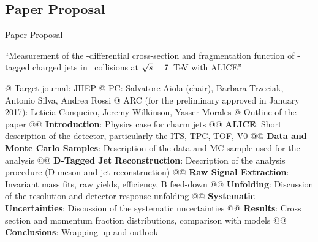 \documentclass[xcolor={usenames,dvipsnames}, aspectratio=169]{beamer}
\begin{document}
\subsection{Paper Proposal}

\begin{frame}[fragile]{Paper Proposal}
\vspace{-10pt}
\begin{center}
``Measurement of the \pt-differential cross-section and fragmentation function of \Dzero-tagged charged jets in \pp\ collisions at $\sqrt{s}=7$~TeV with ALICE''
\end{center}
\scriptsize
\begin{easylist}[itemize]
@ Target journal: JHEP
@ PC: Salvatore Aiola (chair), Barbara Trzeciak, Antonio Silva, Andrea Rossi
@ ARC (for the preliminary approved in January 2017): Leticia Conqueiro, Jeremy Wilkinson, Yasser Morales
 {
@ Outline of the paper
@@ \textbf{Introduction}: Physics case for charm jets
@@ \textbf{ALICE}: Short description of the detector, particularly the ITS, TPC, TOF, V0
@@ \textbf{Data and Monte Carlo Samples}: Description of the data and MC sample used for the analysis
@@ \textbf{D-Tagged Jet Reconstruction}: Description of the analysis procedure (D-meson and jet reconstruction)
@@ \textbf{Raw Signal Extraction}: Invariant mass fits, raw yields, efficiency, B feed-down
@@ \textbf{Unfolding}: Discussion of the resolution and detector response unfolding
@@ \textbf{Systematic Uncertainties}: Discussion of the systematic uncertainties
@@ \textbf{Results}: Cross section and momentum fraction distributions, comparison with models
@@ \textbf{Conclusions}: Wrapping up and outlook
}
\end{easylist}
\end{frame}
\end{document}
